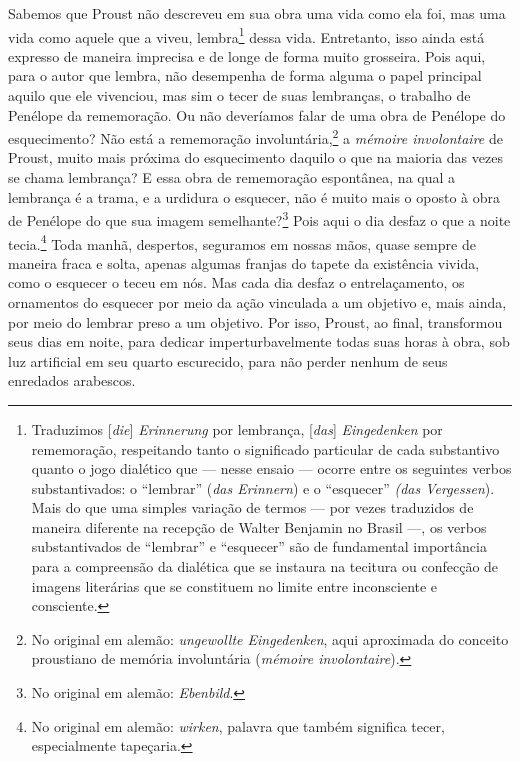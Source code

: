 Sabemos que Proust não descreveu em sua obra uma vida como ela foi, mas
uma vida como aquele que a viveu, lembra\footnote{Traduzimos
  {[}\emph{die}{]} \emph{Erinnerung} por lembrança, {[}\emph{das}{]}
  \emph{Eingedenken} por rememoração, respeitando tanto o significado
  particular de cada substantivo quanto o jogo dialético que --- nesse
  ensaio --- ocorre entre os seguintes verbos substantivados: o ``lembrar'' (\emph{das Erinnern}) e o ``esquecer'' \emph{(das
  Vergessen}). Mais do que uma simples variação de termos --- por vezes
  traduzidos de maneira diferente na recepção de Walter Benjamin no
  Brasil ---, os verbos substantivados de ``lembrar'' e ``esquecer'' são
  de fundamental importância para a compreensão da dialética que se
  instaura na tecitura ou confecção de imagens literárias que se
  constituem no limite entre inconsciente e consciente. \versal{[N. T.]}} dessa vida.
Entretanto, isso ainda está expresso de maneira imprecisa e de longe de
forma muito grosseira. Pois aqui, para o autor que lembra, não
desempenha de forma alguma o papel principal aquilo que ele vivenciou,
mas sim o tecer de suas lembranças, o trabalho de Penélope da
rememoração. Ou não deveríamos falar de uma obra de Penélope do
esquecimento? Não está a rememoração involuntária,\footnote{No
  original em alemão: \emph{ungewollte Eingedenken}, aqui aproximada do
  conceito proustiano de memória involuntária (\emph{mémoire
  involontaire}). \versal{[N. T.]}} a \emph{mémoire involontaire} de Proust, muito mais
próxima do esquecimento daquilo o que na maioria das vezes se chama
lembrança? E essa obra de rememoração espontânea, na qual a lembrança é
a trama, e a urdidura o esquecer, não é muito mais o oposto à obra de
Penélope do que sua imagem semelhante?\footnote{No original em alemão:
  \emph{Ebenbild}. \versal{[N. T.]}} Pois aqui o dia desfaz o que a noite
tecia.\footnote{No original em alemão: \emph{wirken}, palavra que
  também significa tecer, especialmente tapeçaria. \versal{[N. T.]}} Toda manhã,
despertos, seguramos em nossas mãos, quase sempre de maneira fraca e
solta, apenas algumas franjas do tapete da existência vivida, como o
esquecer o teceu em nós. Mas cada dia desfaz o entrelaçamento, os
ornamentos do esquecer por meio da ação vinculada a um objetivo e, mais
ainda, por meio do lembrar preso a um objetivo. Por isso, Proust, ao
final, transformou seus dias em noite, para dedicar imperturbavelmente
todas suas horas à obra, sob luz artificial em seu quarto escurecido,
para não perder nenhum de seus enredados arabescos.

